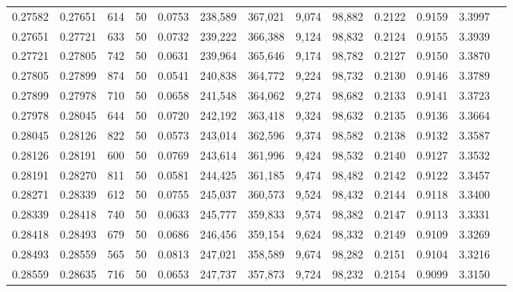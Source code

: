 \begin{tabular}{rrrrrrrrrrrrr}
0.27582 & 0.27651 &   614 &  50 &                                     0.0753 & 238,589 & 367,021 &   9,074 &  98,882 & 0.2122 & 0.9159 & 3.3997 \\
0.27651 & 0.27721 &   633 &  50 &                                     0.0732 & 239,222 & 366,388 &   9,124 &  98,832 & 0.2124 & 0.9155 & 3.3939 \\
0.27721 & 0.27805 &   742 &  50 &                                     0.0631 & 239,964 & 365,646 &   9,174 &  98,782 & 0.2127 & 0.9150 & 3.3870 \\
0.27805 & 0.27899 &   874 &  50 &                                     0.0541 & 240,838 & 364,772 &   9,224 &  98,732 & 0.2130 & 0.9146 & 3.3789 \\
0.27899 & 0.27978 &   710 &  50 &                                     0.0658 & 241,548 & 364,062 &   9,274 &  98,682 & 0.2133 & 0.9141 & 3.3723 \\
0.27978 & 0.28045 &   644 &  50 &                                     0.0720 & 242,192 & 363,418 &   9,324 &  98,632 & 0.2135 & 0.9136 & 3.3664 \\
0.28045 & 0.28126 &   822 &  50 &                                     0.0573 & 243,014 & 362,596 &   9,374 &  98,582 & 0.2138 & 0.9132 & 3.3587 \\
0.28126 & 0.28191 &   600 &  50 &                                     0.0769 & 243,614 & 361,996 &   9,424 &  98,532 & 0.2140 & 0.9127 & 3.3532 \\
0.28191 & 0.28270 &   811 &  50 &                                     0.0581 & 244,425 & 361,185 &   9,474 &  98,482 & 0.2142 & 0.9122 & 3.3457 \\
0.28271 & 0.28339 &   612 &  50 &                                     0.0755 & 245,037 & 360,573 &   9,524 &  98,432 & 0.2144 & 0.9118 & 3.3400 \\
0.28339 & 0.28418 &   740 &  50 &                                     0.0633 & 245,777 & 359,833 &   9,574 &  98,382 & 0.2147 & 0.9113 & 3.3331 \\
0.28418 & 0.28493 &   679 &  50 &                                     0.0686 & 246,456 & 359,154 &   9,624 &  98,332 & 0.2149 & 0.9109 & 3.3269 \\
0.28493 & 0.28559 &   565 &  50 &                                     0.0813 & 247,021 & 358,589 &   9,674 &  98,282 & 0.2151 & 0.9104 & 3.3216 \\
0.28559 & 0.28635 &   716 &  50 &                                     0.0653 & 247,737 & 357,873 &   9,724 &  98,232 & 0.2154 & 0.9099 & 3.3150 \\

\end{tabular}
